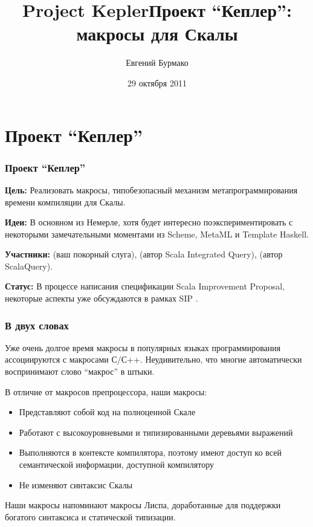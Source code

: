 \documentclass[hyperref={bookmarks=false}]{beamer}
\title{Project Kepler}
\begin{document}
\title{Проект ``Кеплер'': макросы для Скалы}
\author{Евгений Бурмако}
\date{29 октября 2011}
\maketitle

\section{Проект ``Кеплер''}

\begin{frame}[t]
\frametitle{Проект ``Кеплер''}

\textbf{Цель:} Реализовать макросы, типобезопасный механизм метапрограммирования времени компиляции для Скалы.

\textbf{Идеи:} В основном из Немерле, хотя будет интересно поэкспериментировать с некоторыми замечательными моментами из Scheme, MetaML и Template Haskell.

\textbf{Участники:}  (ваш покорный слуга),  (автор Scala Integrated Query),  (автор ScalaQuery).

\textbf{Статус:} В процессе написания спецификации Scala Improvement Proposal, некоторые аспекты уже обсуждаются в рамках SIP .
\end{frame}

\begin{frame}[t]
\frametitle{В двух словах}

Уже очень долгое время макросы в популярных языках программирования ассоциируются с макросами С/С++. Неудивительно, что многие автоматически воспринимают слово ``макрос'' в штыки.

В отличие от макросов препроцессора, наши макросы:
\begin{itemize}
\item Представляют собой код на полноценной Скале
\item Работают с высокоуровневыми и типизированными деревьями выражений
\item Выполняются в контексте компилятора, поэтому имеют доступ ко всей семантической информации, доступной компилятору
\item Не изменяют синтаксис Скалы
\end{itemize}

Наши макросы напоминают макросы Лиспа, доработанные для поддержки богатого синтаксиса и статической типизации.
\end{frame}
\end{document}
